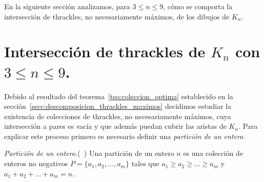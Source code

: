   En la siguiente sección analizamos, para $3 \leq n \leq 9$, cómo se comporta la intersección de
  thrackles, no necesariamente máximos, de los dibujos de $K_n$.

\section{Intersección de thrackles de $K_n$ con $3\leq n \leq 9$.}\label{secc:interseccion_thrackles}

    Debido al resultado del teorema~\ref{teo:coleccion_optima} establecido
    en la sección~\ref{secc:descomposicion_thrackles_maximos} decidimos estudiar
    la existencia de colecciones de thrackles, no necesariamente máximos,
    cuya intersección a pares es vacía y que además puedan cubrir las aristas
    de $K_n$. Para explicar este proceso primero es necesario definir una
    \emph{partición de un entero}.

    \begin{definition}{\emph{Partición de un entero.}(~\cite{Knuth2011})}
      Una partición de un entero $n$ es una colección de enteros
      no negativos $P = \{a_1, a_2, \dots, a_m\}$ tales que
      $a_1 \geq a_2\geq \dots \geq a_m$ y $a_1 + a_2 + \dots + a_m = n$.
    \end{definition}

